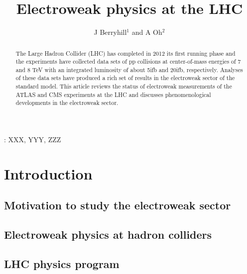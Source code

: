 \documentclass[12pt]{iopart}
\begin{document}
\title[Electroweak phyiscs at the LHC]{Electroweak physics at the LHC}
\author{J Berryhill$^1$ and A Oh$^2$}

\address{$^1$ Fermi National Accelerator Laboratory, Batavia, IL, USA}
\address{$^2$ School of Physics and Astronomy, University of Manchester, Manchester, UK}


\begin{abstract}
The Large Hadron Collider (LHC) has completed in 2012 its first
running phase and the experiments have collected data sets of pp
collisions at center-of-mass energies of 7 and 8 TeV with an
integrated luminosity of about 5ifb and 20ifb, respectively.  Analyses
of these data sets have produced a rich set of results in the
electroweak sector of the standard model. This article reviews the
status of electroweak measurements of the ATLAS and CMS experiments at
the LHC and discusses phenomenological developments in the electroweak
sector.
\end{abstract}

%
\vspace{2pc}
: XXX, YYY, ZZZ
%
\submitto{\jpg}
%
\maketitle
% 
%


\section{Introduction}
\subsection{Motivation to study the electroweak sector}
\subsection{Electroweak physics at hadron colliders}
\subsection{LHC physics program}
\end{document}

